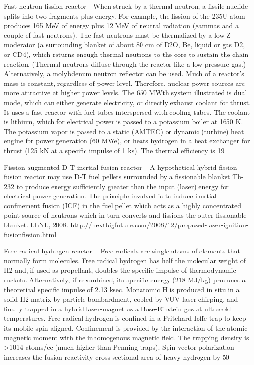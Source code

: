 \documentclass[a4paper]{book}
\begin{document}
Fast-neutron fission reactor - When struck by a thermal neutron, a fissile nuclide splits into two fragments plus energy. For example, the fission of the 235U atom produces 165 MeV of energy plus 12 MeV of neutral radiation (gammas and a couple of fast neutrons).  The fast neutrons must be thermalized by a low Z moderator (a surrounding blanket of about 80 cm of D2O, Be, liquid or gas D2, or CD4), which returns enough thermal neutrons to the core to sustain the chain reaction.  (Thermal neutrons diffuse through the reactor like a low pressure gas.)  Alternatively, a molybdenum neutron reflector can be used. Much of a reactor’s mass is constant, regardless of power level. Therefore, nuclear power sources are more attractive at higher power levels. The 650 MWth system illustrated is dual mode, which can either generate electricity, or directly exhaust coolant for thrust.   It uses a fast reactor with fuel tubes interspersed with cooling tubes.  The coolant is lithium, which for electrical power is passed to a potassium boiler at 1650 K. The potassium vapor is passed to a static (AMTEC) or dynamic (turbine) heat engine for power generation (60 MWe), or heats hydrogen in a heat exchanger for thrust (125 kN at a specific impulse of 1 ks).  The thermal efficiency is 19%
 
Fission-augmented D-T inertial fusion reactor – A hypothetical hybrid fission-fusion reactor may use D-T fuel pellets surrounded by a fissionable blanket Th-232 to produce energy sufficiently greater than the input (laser) energy for electrical power generation. The principle involved is to induce inertial confinement fusion (ICF) in the fuel pellet which acts as a highly concentrated point source of neutrons which in turn converts and fissions the outer fissionable blanket. LLNL, 2008.
http://nextbigfuture.com/2008/12/proposed-laser-ignition-fusionfission.html
 
Free radical hydrogen reactor – Free radicals are single atoms of elements that normally form molecules.  Free radical hydrogen has half the molecular weight of H2 and, if used as propellant, doubles the specific impulse of thermodynamic rockets.  Alternatively, if recombined, its specific energy (218 MJ/kg) produces a theoretical specific impulse of 2.13 ksec.  Monatomic H is produced in situ in a solid H2 matrix by particle bombardment, cooled by VUV laser chirping, and finally trapped in a hybrid laser-magnet as a Bose-Einstein gas at ultracold temperatures. Free radical hydrogen is confined in a Pritchard-Ioffe trap to keep its mobile spin aligned.  Confinement is provided by the interaction of the atomic magnetic moment with the inhomogenous magnetic field. The trapping density is >1014 atoms/cc   (much higher than Penning traps).  Spin-vector polarization increases the fusion reactivity cross-sectional area of heavy hydrogen by 50%
 
\end{document}
